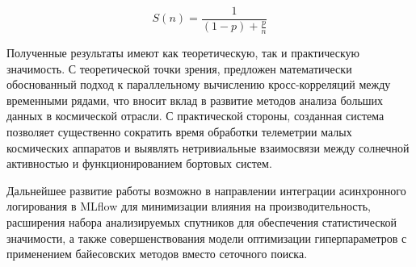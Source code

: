 \begin{equation}
	S(n) = \frac{1}{(1-p) + \frac{p}{n}}
\end{equation}

\vspace{0.5cm}

Полученные результаты имеют как теоретическую, так и практическую значимость. С
теоретической точки зрения, предложен математически обоснованный подход к
параллельному вычислению кросс-корреляций между временными рядами, что вносит
вклад в развитие методов анализа больших данных в космической отрасли. С
практической стороны, созданная система позволяет существенно сократить время
обработки телеметрии малых космических аппаратов и выявлять нетривиальные
взаимосвязи между солнечной активностью и функционированием бортовых систем.

\vspace{0.5cm}

Дальнейшее развитие работы возможно в направлении интеграции асинхронного
логирования в MLflow для минимизации влияния на производительность, расширения
набора анализируемых спутников для обеспечения статистической значимости, а
также совершенствования модели оптимизации гиперпараметров с применением
байесовских методов вместо сеточного поиска.
